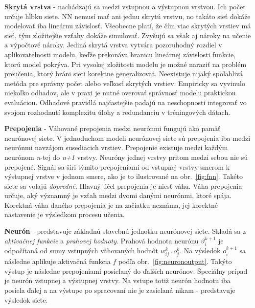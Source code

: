 \textbf{Skrytá vrstva} - nachádzajú sa medzi vstupnou a výstupnou vrstvou. Ich počet určuje hĺbku siete. NN nemusí mať ani jednu skrytú vrstvu, no takáto sieť dokáže modelovať iba lineárnu závislosť. Všeobecne platí, že čím viac skrytých vrstiev má sieť, tým zložitejšie vzťahy dokáže simulovať. Zvyšujú sa však aj nároky na učenie a výpočtové nároky. Jediná skrytá vrstva vytvára pozoruhodný rozdiel v aplikovatelnosti modelu, keďže prekonáva hranicu lineárnej závislosti funkcie, ktorú model pokrýva. Pri vysokej zložitosti modelu je možné naraziť na problém preučenia, ktorý bráni sieti korektne generalizovať. Neexistuje nijaký spoľahlivá metóda pre správny počet alebo veľkosť skrytých vrstiev. Empiricky sa vyvinulo niekoľko odhadov, ale v praxi je nutné overovať správnosť modelu praktickou evaluáciou. Odhadové pravidlá najčastejšie padajú na neschopnosti integrovať vo svojom rozhodnutí komplexitu úlohy a redundanciu v tréningových dátach.
\noindent

\textbf{Prepojenia} - Váhované prepojenia medzi neurónmi fungujú ako pamäť neurónovej siete. V jednoduchom modeli neurónovej siete sú prepojenia iba medzi neurónmi navzájom susediacich vrstiev. Prepojenie existuje medzi každým neurónom \textit{n}-tej do \textit{n+1} vrstvy. Neuróny jednej vrstvy pritom medzi sebou nie sú prepojené. Signál sa šíri týmito prepojeniami od vstupnej vrstvy smerom k výstupnej vrstve v jednom smere, ako je to ilustrované na obr.~\ref{fig:fnn}. Takéto siete sa volajú \textit{dopredné}. Hlavný účel prepojenia je niesť váhu. Váha prepojenia určuje, aký významný je vzťah medzi dvomi danými neurónmi, ktoré spája. Korektná váha daného prepojenia je na začiatku neznáma, jej korektné nastavenie je výsledkom procesu učenia.
\noindent

\textbf{Neurón} - predstavuje základnú stavebnú jednotku neurónovej siete. Skladá sa z \textit{aktivačnej funkcie} a \textit{prahovej hodnoty}. Prahová hodnota neurónu $\vartheta _{i}^{k+1}$  je odpočítaná od sumy vstupných váhovaných hodnôt $ w_{ij}^{k}\, .\, o_{j}^{k}$. 
\newline
Na výsledok $o_{i}^{k+1}$ sa následne aplikuje aktivačná funkcia $f$ podľa obr.~\ref{fig:neuronoutput}. Takýto výstup je následne prepojeniami posielaný do ďaľších neurónov. Špeciálny prípad je neurón vstupnej a výstupnej vrstvy. Na vstupe totiž neurón hodnotu iba posiela ďalej a na výstupe po spracovaní nie je zasielaná nikam - predstavuje výsledok siete.
\newline



